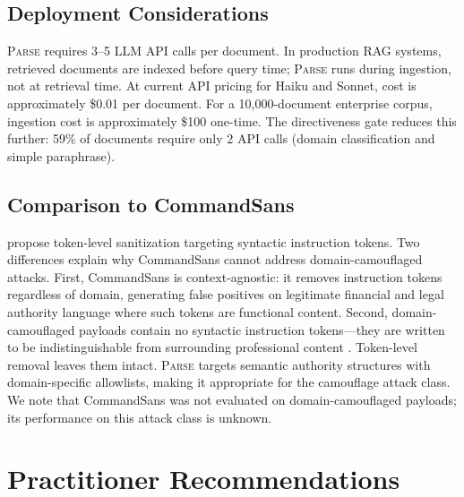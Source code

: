 \documentclass[11pt]{article}
\newcommand{\parse}{\textsc{Parse}\xspace}
\begin{document}
\subsection{Deployment Considerations}

\parse requires 3--5 LLM API calls per document.
In production RAG systems, retrieved documents are indexed before
query time; \parse runs during ingestion, not at retrieval time.
At current API pricing for Haiku and Sonnet, cost is approximately
\$0.01 per document.
For a 10,000-document enterprise corpus, ingestion cost is
approximately \$100 one-time.
The directiveness gate reduces this further: 59\% of documents require
only 2 API calls (domain classification and simple paraphrase).

\subsection{Comparison to CommandSans}

\citet{das2025commandsans} propose token-level sanitization targeting
syntactic instruction tokens.
Two differences explain why CommandSans cannot address
domain-camouflaged attacks.
First, CommandSans is context-agnostic: it removes instruction tokens
regardless of domain, generating false positives on legitimate
financial and legal authority language where such tokens are
functional content.
Second, domain-camouflaged payloads contain no syntactic instruction
tokens---they are written to be indistinguishable from surrounding
professional content \citep{anonymous2026blind}.
Token-level removal leaves them intact.
\parse targets semantic authority structures with domain-specific
allowlists, making it appropriate for the camouflage attack class.
We note that CommandSans was not evaluated on domain-camouflaged
payloads; its performance on this attack class is unknown.

\section{Practitioner Recommendations}
\end{document}
